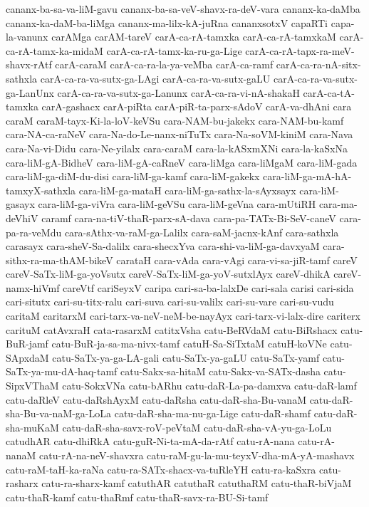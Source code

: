 {cananx-ba-sa-va-liM-gavu
cananx-ba-sa-veV-shavx-ra-deV-vara
cananx-ka-daMba
cananx-ka-daM-ba-liMga
cananx-ma-lilx-kA-juRna
cananxsotxV
capaRTi
capa-la-vanunx
carAMga
carAM-tareV
carA-ca-rA-tamxka
carA-ca-rA-tamxkaM
carA-ca-rA-tamx-ka-midaM
carA-ca-rA-tamx-ka-ru-ga-Lige
carA-ca-rA-tapx-ra-meV-shavx-rAtf
carA-caraM
carA-ca-ra-la-ya-veMba
carA-ca-ramf
carA-ca-ra-nA-sitx-sathxla
carA-ca-ra-va-sutx-ga-LAgi
carA-ca-ra-va-sutx-gaLU
carA-ca-ra-va-sutx-ga-LanUnx
carA-ca-ra-va-sutx-ga-Lanunx
carA-ca-ra-vi-nA-shakaH
carA-ca-tA-tamxka
carA-gashacx
carA-piRta
carA-piR-ta-parx-sAdoV
carA-va-dhAni
cara
caraM
caraM-tayx-Ki-la-loV-keVSu
cara-NAM-bu-jakekx
cara-NAM-bu-kamf
cara-NA-ca-raNeV
cara-Na-do-Le-nanx-niTuTx
cara-Na-soVM-kiniM
cara-Nava
cara-Na-vi-Didu
cara-Ne-yilalx
cara-caraM
cara-la-kASxmXNi
cara-la-kaSxNa
cara-liM-gA-BidheV
cara-liM-gA-caRneV
cara-liMga
cara-liMgaM
cara-liM-gada
cara-liM-ga-diM-du-disi
cara-liM-ga-kamf
cara-liM-gakekx
cara-liM-ga-mA-hA-tamxyX-sathxla
cara-liM-ga-mataH
cara-liM-ga-sathx-la-sAyxsayx
cara-liM-gasayx
cara-liM-ga-viVra
cara-liM-geVSu
cara-liM-geVna
cara-mUtiRH
cara-ma-deVhiV
caramf
cara-na-tiV-thaR-parx-sA-dava
cara-pa-TATx-Bi-SeV-caneV
cara-pa-ra-veMdu
cara-sAthx-va-raM-ga-Lalilx
cara-saM-jacnx-kAnf
cara-sathxla
carasayx
cara-sheV-Sa-dalilx
cara-shecxYva
cara-shi-va-liM-ga-davxyaM
cara-sithx-ra-ma-thAM-bikeV
carataH
cara-vAda
cara-vAgi
cara-vi-sa-jiR-tamf
careV
careV-SaTx-liM-ga-yoVsutx
careV-SaTx-liM-ga-yoV-sutxlAyx
careV-dhikA
careV-namx-hiVmf
careVtf
cariSeyxV
caripa
cari-sa-ba-lalxDe
cari-sala
carisi
cari-sida
cari-situtx
cari-su-titx-ralu
cari-suva
cari-su-valilx
cari-su-vare
cari-su-vudu
caritaM
caritarxM
cari-tarx-va-neV-neM-be-nayAyx
cari-tarx-vi-lalx-dire
cariterx
carituM
catAvxraH
cata-rasarxM
catitxVsha
catu-BeRVdaM
catu-BiRshacx
catu-BuR-jamf
catu-BuR-ja-sa-ma-nivx-tamf
catuH-Sa-SiTxtaM
catuH-koVNe
catu-SApxdaM
catu-SaTx-ya-ga-LA-gali
catu-SaTx-ya-gaLU
catu-SaTx-yamf
catu-SaTx-ya-mu-dA-haq-tamf
catu-Sakx-sa-hitaM
catu-Sakx-va-SATx-dasha
catu-SipxVThaM
catu-SokxVNa
catu-bARhu
catu-daR-La-pa-damxva
catu-daR-lamf
catu-daRleV
catu-daRshAyxM
catu-daRsha
catu-daR-sha-Bu-vanaM
catu-daR-sha-Bu-va-naM-ga-LoLa
catu-daR-sha-ma-nu-ga-Lige
catu-daR-shamf
catu-daR-sha-muKaM
catu-daR-sha-savx-roV-peVtaM
catu-daR-sha-vA-yu-ga-LoLu
catudhAR
catu-dhiRkA
catu-guR-Ni-ta-mA-da-rAtf
catu-rA-nana
catu-rA-nanaM
catu-rA-na-neV-shavxra
catu-raM-gu-la-mu-teyxV-dha-mA-yA-mashavx
catu-raM-taH-ka-raNa
catu-ra-SATx-shacx-va-tuRleYH
catu-ra-kaSxra
catu-rasharx
catu-ra-sharx-kamf
catuthAR
catuthaR
catuthaRM
catu-thaR-biVjaM
catu-thaR-kamf
catu-thaRmf
catu-thaR-savx-ra-BU-Si-tamf
}
